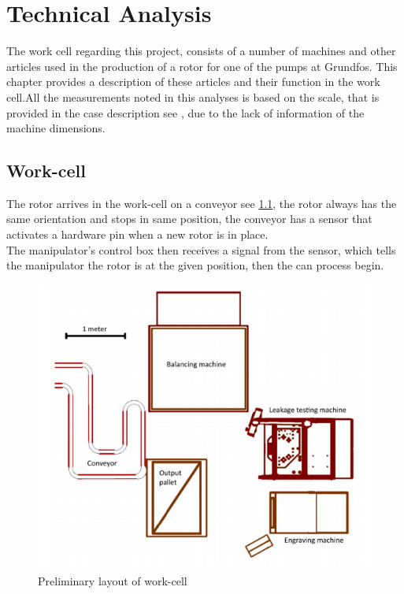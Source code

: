  \chapter{Technical Analysis} \label{TechAnalysis}
 
The work cell regarding this project, consists of a number of machines and other articles used in the production of a rotor for one of the pumps at Grundfos. This chapter provides a description of these articles and their function in the work cell\cite{robotsave}.All the measurements noted in this analyses is based on the scale, that is provided in the case description see \cite{Case}, due to the lack of information of the machine dimensions. \\ 
 


 \section{Work-cell}
 The rotor arrives in the work-cell on a conveyor see \ref{fig:Layoutworkcell}, the rotor always has the same orientation and stops in same position, the conveyor has a sensor that activates a hardware pin when a new rotor is in place.\\
 The manipulator's control box then receives a signal from the sensor, which tells the manipulator the rotor is at the given position, then the can process begin.\\
\begin{figure}[H]
    \centering
   \includegraphics[width=\textwidth]{TechnicalAnlysis/layout.PNG}
    \caption{Preliminary layout of work-cell\cite{Case}}
    \label{fig:Layoutworkcell} 
\end{figure}

